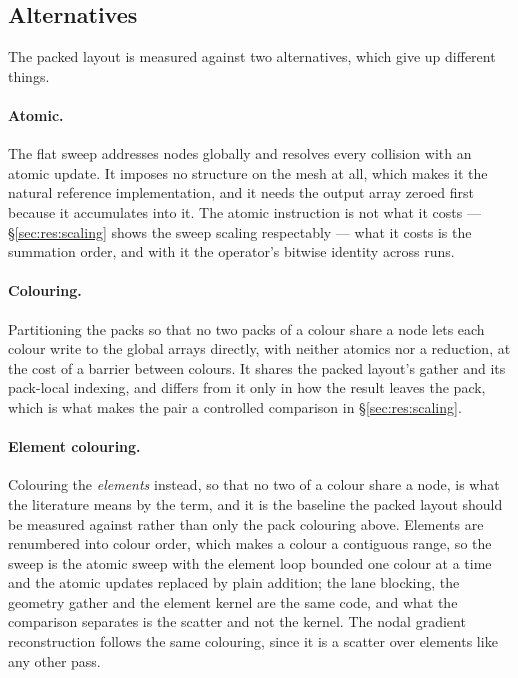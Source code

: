\documentclass[sigconf,nonacm]{acmart}
\begin{document}
\subsection{Alternatives}
\label{sec:apply:alternatives}



The packed layout is measured against two alternatives, which give up different things.

\paragraph{Atomic.} The flat sweep addresses nodes globally and resolves every collision with an
atomic update. It imposes no structure on the mesh at all, which makes it the natural reference
implementation, and it needs the output array zeroed first because it accumulates into it. The
atomic instruction is not what it costs --- \S\ref{sec:res:scaling} shows the sweep scaling
respectably --- what it costs is the summation order, and with it the operator's bitwise
identity across runs.

\paragraph{Colouring.} Partitioning the packs so that no two packs of a colour share a node lets
each colour write to the global arrays directly, with neither atomics nor a reduction, at the
cost of a barrier between colours. It shares the packed layout's gather and its pack-local
indexing, and differs from it only in how the result leaves the pack, which is what makes the
pair a controlled comparison in \S\ref{sec:res:scaling}.

\paragraph{Element colouring.} Colouring the \emph{elements} instead, so that no two of a
colour share a node, is what the literature means by the term, and it is the baseline the
packed layout should be measured against rather than only the pack colouring above. Elements are
renumbered into colour order, which makes a colour a contiguous range, so the sweep is the atomic
sweep with the element loop bounded one colour at a time and the atomic updates replaced by plain
addition; the lane blocking, the geometry gather and the element kernel are the same code, and
what the comparison separates is the scatter and not the kernel. The nodal gradient
reconstruction follows the same colouring, since it is a scatter over elements like any other
pass.
\end{document}
